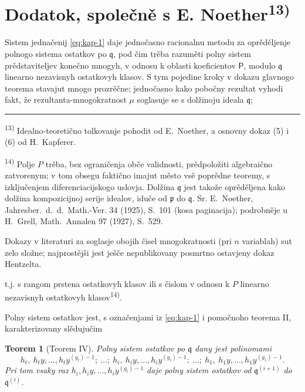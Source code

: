 \documentclass[11pt]{article}
\newcommand{\foreign}[1]{#1}
\theoremstyle{plain}
\newtheorem{satz}{Teorem}
\begin{document}
\newpage
\section*{Dodatok, společně s E. Noether\textsuperscript{13)}}

Sistem jednačenij \eqref{eq:kap-1} daje jednočasno racionalnu
metodu za oprěděljenje polnogo sistema ostatkov po $\mathfrak{q}$,
pod čim trěba razuměti polny sistem prědstaviteljev konečno mnogyh,
v odnosu k oblasti koeficientov $\mathsf{P}$, modulo $\mathfrak{q}$ linearno
nezavisnyh ostatkovyh klasov. S tym pojedine kroky v dokazu
glavnogo teorema stavajut mnogo prozrěčne; jednočasno kako
pobočny rezultat vyhodi fakt, že rezultanta-mnogokratnost $\mu$
soglasuje se s dolžinoju ideala $\mathfrak{q}$;

\vspace{0.5em}
\noindent\rule{\textwidth}{0.4pt}
\vspace{0.3em}

{\footnotesize
\textsuperscript{13)} Idealno-teoretično tolkovanje pohodit od E.\ Noether, a osnovny
dokaz (5) i (6) od H.\ Kapferer.

\textsuperscript{14)} Polje $P$ trěba, bez ograničenja obče validnosti, prědpoložiti
algebraično zatvorenym; v tom obsegu faktično imajut město vsě poprědne
teoremy, s izključenjem diferenciacijskogo uslovja. Dolžina
$\mathfrak{q}$ jest takože oprěděljena kako dolžina kompozicijnoj
serije idealov, iduče od $\mathfrak{p}$ do $\mathfrak{q}$. Sr.
E.\ Noether, \foreign{Jahresber.\ d.\ d.\ Math.-Ver.} 34 (1925), S.~101
(kosa paginacija); podrobněje u H.\ Grell, \foreign{Math.\ Annalen} 97
(1927), S.~529.

Dokazy v literaturi za soglasje obojih čisel mnogokratnosti (pri
$n$ variablah) sut zelo složne; najprostějši jest ješče nepublikovany
posmrtno ostavjeny dokaz Hentzelta.
}

\vspace{1em}
t.j. s rangom prstena ostatkovyh klasov ili s čislom v odnosu k $P$
linearno nezavisnyh ostatkovyh klasov\textsuperscript{14)}.

Polny sistem ostatkov jest, s označenjami iz \eqref{eq:kap-1} i
pomočnoho teorema II, karakterizovany slědujučim

\begin{satz}[Teorem IV]\label{satz:kap-IV}
Polny sistem ostatkov po $\mathfrak{q}$ dany jest polinomami
\[
h_{t},\ h_{t}y,\ldots,h_{t}y^{(g_{t})-1};\ \ldots;\
h_{i},\ h_{i}y,\ldots,h_{i}y^{(g_{i})-1};\ \ldots;\
h_{1},\ h_{1}y,\ldots,h_{1}y^{(g_{1})-1}.
\]
Pri tom vsaky raz
$h_{i}, h_{i}y, \ldots, h_{i}y^{(g_{i})-1}$ daje polny
sistem ostatkov od $\mathfrak{q}^{(i+1)}$ do
$\mathfrak{q}^{(i)}$.
\end{satz}
\end{document}
